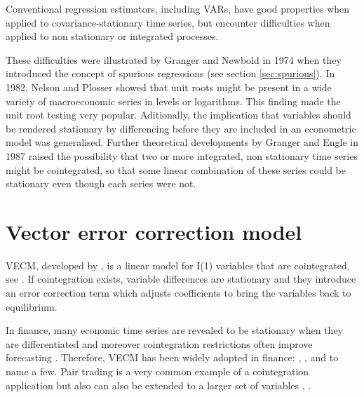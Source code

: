 Conventional regression estimators, including VARs, have good properties when
applied to covariance-stationary time series, but encounter difficulties when
applied to non stationary or integrated processes.

These difficulties were illustrated by Granger and Newbold in 1974
\cite{granger1974} when they introduced the concept of spurious regressions (see
section \ref{sec:spurious}). In 1982, Nelson and Plosser \cite{nelson1982}
showed that unit roots might be present in a wide variety of macroeconomic
series in levels or logarithms. This finding made the unit root testing very
popular. Aditionally, the implication that variables should be rendered
stationary by differencing before they are included in an econometric model was
generalised.  Further theoretical developments by Granger and Engle in 1987
\cite{engle87} raised the possibility that two or more integrated, non
stationary time series might be cointegrated, so that some linear combination of
these series could be stationary even though each series were not. 

\section{Vector error correction model}\label{sec:vecm}

VECM, developed by \cite{engle87}, is a linear model for I(1) variables that are
cointegrated, see \cite{banerjee1993}. If cointegration exists, variable
differences are stationary and they introduce an error correction term which
adjusts coefficients to bring the variables back to equilibrium. 

In finance, many economic time series are revealed to be stationary when they
are differentiated and moreover cointegration restrictions often improve
forecasting \cite{duy1998}. Therefore, VECM has been widely adopted in finance:
\cite{mukherjee1995}, \cite{maysami2000}, \cite{arestis2001} and
\cite{seong2013} to name a few. Pair trading is a very common example of a
cointegration application \cite{herlemont2003} but also can also be extended to
a larger set of variables \cite{mukherjee1995}, \cite{engle2004}.


